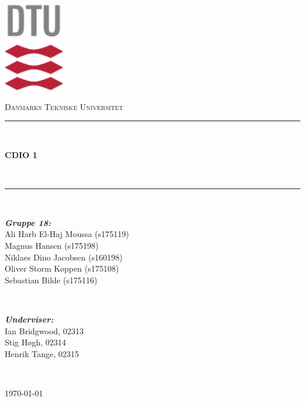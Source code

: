 \begin{titlepage}
	\centering
	\includegraphics[width=0.2\textwidth]{graphics/DTU-logo-CMYK}\par\vspace{1cm}
	{\scshape\LARGE Danmarks Tekniske Universitet \par}
	\vspace{3.5cm}
	\rule{\linewidth}{0.2 mm} \\[0.4 cm]
	{\huge\bfseries CDIO 1 \par} \
	\rule{\linewidth}{0.2 mm} \\[1.5 cm]
	\vspace{1cm}
	
	\begin{minipage}{0.5\textwidth}
		\begin{flushleft}
			\small
			\emph{\textbf{Gruppe 18:}}\\
			Ali Harb El-Haj Moussa (s175119) \\
			Magnus Hansen (s175198) \\
			Niklaes Dino Jacobsen (s160198) \\
			Oliver Storm Køppen (s175108) \\
			Sebastian Bilde (s175116)
		\end{flushleft}
	\end{minipage}
	~
	\begin{minipage}{0.4\textwidth}
		\begin{flushright}
			\small
			\emph{\textbf{Underviser:}} \\
			Ian Bridgwood, 02313 \\
			Stig Høgh, 02314 \\
			Henrik Tange, 02315
		\end{flushright}
	\end{minipage}\\[4cm]
	
	\vfill
	{\large \today\par}
\end{titlepage}

\pagebreak

